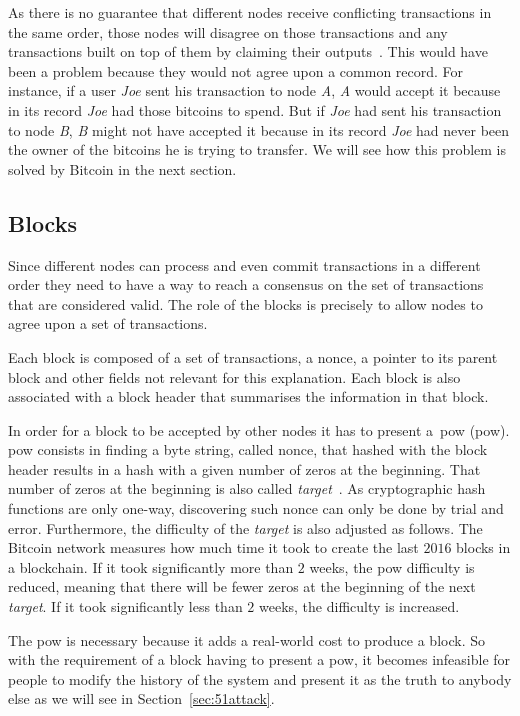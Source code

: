 As there is no guarantee that different nodes receive conflicting transactions in the same order, those nodes will disagree on those transactions and any transactions built on top of them by claiming their outputs~\cite{decker2013information}. This would have been a problem because they would not agree upon a common record. For instance, if a user \textsl{Joe} sent his transaction to node \textit{A}, \textit{A} would accept it because in its record \textsl{Joe} had those bitcoins to spend. But if \textsl{Joe} had sent his transaction to node \textit{B}, \textit{B} might not have accepted it because in its record \textsl{Joe} had never been the owner of the bitcoins he is trying to transfer. We will see how this problem is solved by Bitcoin in the next section.

\subsection{Blocks}
\label{sec:blocks}

Since different nodes can process and even commit transactions in a different order they need to have a way to reach a consensus on the set of transactions that are considered valid. The role of the blocks is precisely to allow nodes to agree upon a set of transactions.

Each block is composed of a set of transactions, a nonce, a pointer to its parent block and other fields not relevant for this explanation. Each block is also associated with a block header that summarises the information in that block.

In order for a block to be accepted by other nodes it has to present a~\acrlong{pow} (\acrshort{pow}). \acrshort{pow} consists in finding a byte string, called nonce, that hashed with the block header results in a hash with a given number of zeros at the beginning. That number of zeros at the beginning is also called \textit{target}~\cite{decker2013information}. As cryptographic hash functions are only one-way, discovering such nonce can only be done by trial and error. Furthermore, the difficulty of the \textit{target} is also adjusted as follows. The Bitcoin network measures how much time it took to create the last $2016$ blocks in a blockchain. If it took significantly more than $2$ weeks, the \acrshort{pow} difficulty is reduced, meaning that there will be fewer zeros at the beginning of the next \textit{target}. If it took significantly less than $2$ weeks, the difficulty is increased. 

The \acrshort{pow} is necessary because it adds a real-world cost to produce a block. So with the requirement of a block having to present a \acrshort{pow}, it becomes infeasible for people to modify the history of the system and present it as the truth to anybody else as we will see in Section~\ref{sec:51attack}.


